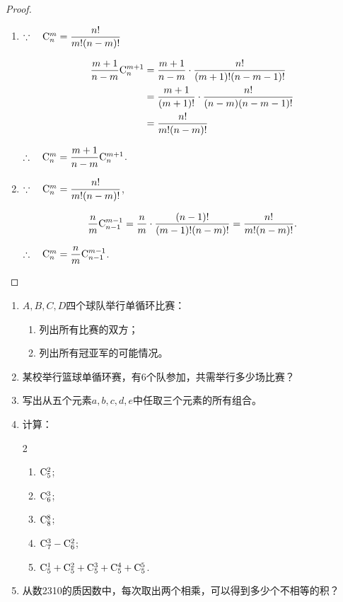 \begin{proof}
\begin{enumerate}[(1)]
    \item $\because\quad \comb{n}{m}=\frac{n!}{m!(n-m)!}$

\[\begin{split}
\frac{m+1}{n-m}\comb{n}{m+1}&=\frac{m+1}{n-m}\cdot \frac{n!}{(m+1)!(n-m-1)!}\\
& =\frac{m+1}{(m+1)!}\cdot \frac{n!}{(n-m)(n-m-1)!}\\
&=\frac{n!}{m!(n-m)!}
\end{split}\]

$\therefore\quad \comb{n}{m}=\frac{m+ 1}{n-m}\comb{n}{m+1}$.

    \item $\because\quad \comb{n}{m}=\frac{n!}{m!(n-m)!}$,

\[\frac{n}{m}\comb{n-1}{m-1}=\frac{n}{m}\cdot \frac{(n-1)!}{(m-1)!(n-m)!}=\frac{n!}{m!(n-m)!}.\]

$\therefore\quad \comb{n}{m}=\frac{n}{m}\comb{n-1}{m-1}$.
\end{enumerate}
\end{proof}


\begin{ex}
\begin{enumerate}
    \item $A,B,C,D$四个球队举行单循环比赛：
\begin{enumerate}[(1)]
    \item 列出所有比赛的双方；
    \item 列出所有冠亚军的可能情况。
\end{enumerate}
\item 某校举行篮球单循环赛，有6个队参加，共需举行多少场比赛？
\item 写出从五个元素$a,b,c,d,e$中任取三个元素的所有组合。
\item 计算：
\begin{multicols}{2}
\begin{enumerate}[(1)]
    \item $\comb{5}{2}$;
    \item $\comb{6}{3}$;
    \item $\comb{8}{8}$;
    \item $\comb{7}{3}-\comb{6}{2}$;
\item $\comb{5}{1}+\comb{5}{2}+\comb{5}{3}+\comb{5}{4}+\comb{5}{5}$.
\end{enumerate}
\end{multicols}
\item 从数2310的质因数中，每次取出两个相乘，可以得到多少个不相等的积？
\end{enumerate}
 \end{ex}   

